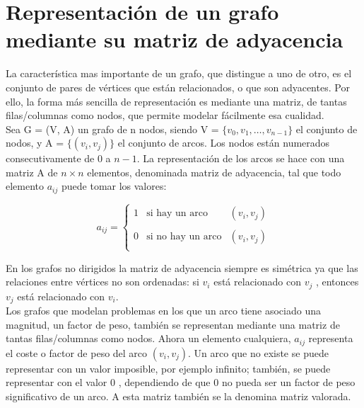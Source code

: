 \documentclass[12pt, A4]{article}
\begin{document}
\section{Representación de un grafo mediante su matriz de adyacencia}
La característica mas importante de un grafo, que distingue a uno de otro, es el conjunto de
pares de vértices que están relacionados, o que son adyacentes. Por ello, la forma más sencilla
de representación es mediante una matriz, de tantas filas/columnas como nodos, que permite
modelar fácilmente esa cualidad.\\
Sea G = (V, A) un grafo de n nodos, siendo V = $\{v_{0},v_{1},\ldots,v_{n-1}\}$ el conjunto de
nodos, y A = $\{(v_{i},v_{j})\}$ el conjunto de arcos. Los nodos están numerados consecutivamente de
$0$ a $n-1$. La representación de los arcos se hace con una matriz A de $n \times n$ elementos, denominada matriz de adyacencia, tal que todo elemento $a_{ij}$ puede tomar los valores:

\[a_{ij}=\left\{\begin{array}{lcc}
1&\mbox{si hay un arco}& (v_{i},v_{j})\\\\
0&\mbox{si no hay un arco}& (v_{i},v_{j})\\
\end{array}\right.\]

En los grafos no dirigidos la matriz de adyacencia siempre es simétrica ya que las relaciones entre
vértices no son ordenadas: si $v_{i}$ está relacionado con $v_{j}$ , entonces $v_{j}$ está relacionado con $v_{i}$.\\
Los grafos que modelan problemas en los que un arco tiene asociado una magnitud, un factor
de peso, también se representan mediante una matriz de tantas filas/columnas como nodos. Ahora
un elemento cualquiera, $a_{ij}$ representa el coste o factor de peso del arco $(v_{i} , v_{j} )$. Un arco que
no existe se puede representar con un valor imposible, por ejemplo infinito; también, se puede
representar con el valor $0$ , dependiendo de que $0$ no pueda ser un factor de peso significativo de
un arco. A esta matriz también se la denomina matriz valorada.
\end{document}
